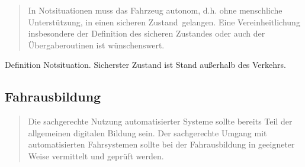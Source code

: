\documentclass[twoside,a4paper,12pt]{article}
\begin{document}
\begin{quote}
\glqq
In Notsituationen muss das Fahrzeug autonom, d.h. ohne menschliche Unterstützung, in
einen \glqq sicheren Zustand\grqq\ gelangen. Eine Vereinheitlichung insbesondere der Definition
des sicheren Zustandes oder auch der Übergaberoutinen ist wünschenswert.\grqq\mbox{~\cite[S. 13]{ek}}
\end{quote}

Definition Notsituation. Sicherster Zustand ist Stand außerhalb des Verkehrs.

\subsection{Fahrausbildung} \label{Fahrausbildung}

\begin{quote}
\glqq
Die sachgerechte Nutzung automatisierter Systeme sollte bereits Teil der allgemeinen digitalen Bildung sein. Der sachgerechte 
Umgang mit automatisierten Fahrsystemen sollte
bei der Fahrausbildung in geeigneter Weise vermittelt und geprüft werden.\grqq\mbox{~\cite[S. 13]{ek}}
\end{quote}
\end{document}

